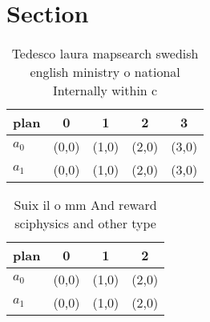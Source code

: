 \documentclass[a4paper]{article}
\begin{document}
\section{Section}

\begin{table}
\begin{adjustbox}{width=0.5\columnwidth}
\begin{tabular}{|l|l|l|l|l|}
\hline
\textbf{plan} & \multicolumn{1}{c|}{\textbf{0}} & \multicolumn{1}{c|}{\textbf{1}} & \multicolumn{1}{c|}{\textbf{2}} & \multicolumn{1}{c|}{\textbf{3}} \\ \hline
\textbf{$a_0$}  & (0,0) & (1,0) & (2,0) & (3,0) \\ \hline
\textbf{$a_1$}  & (0,0) & (1,0) & (2,0) & (3,0) \\ \hline
\end{tabular}
\end{adjustbox}
\caption{Tedesco laura mapsearch swedish english ministry o national Internally within c
}
\end{table}

\begin{table}
\begin{adjustbox}{width=0.6\columnwidth}
\begin{tabular}{|l|l|l|l|}
\hline
\textbf{plan} & \multicolumn{1}{c|}{\textbf{0}} & \multicolumn{1}{c|}{\textbf{1}} & \multicolumn{1}{c|}{\textbf{2}} \\ \hline
\textbf{$a_0$}  & (0,0) & (1,0) & (2,0) \\ \hline
\textbf{$a_1$}  & (0,0) & (1,0) & (2,0) \\ \hline
\end{tabular}
\end{adjustbox}
\caption{Suix il o mm And reward sciphysics and other type
}
\end{table}
\end{document}
